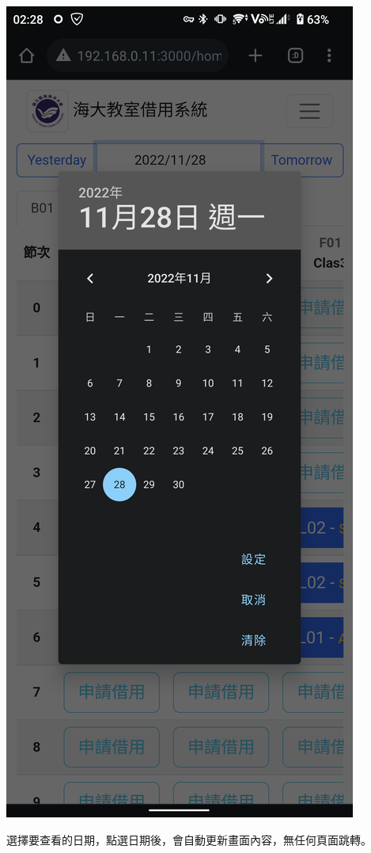 \documentclass{article}
\begin{document}
\begin{minipage}{0.4\textwidth}

	\begin{center}
		\includegraphics[width=\linewidth]{SelectDatePhone.png}
	\end{center}
\end{minipage}
\begin{minipage}{0.5\textwidth}
	選擇要查看的日期，點選日期後，會自動更新畫面內容，無任何頁面跳轉。
\end{minipage}
\end{document}

